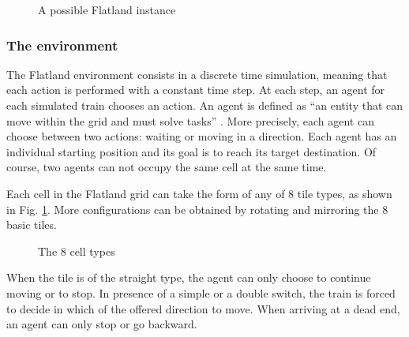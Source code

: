 \documentclass[a4paper, 12pt]{article}
\numberwithin{equation}{section}
\begin{document}
\begin{figure}[h]
	\centering
		\caption{A possible Flatland instance}
\end{figure}

\subsubsection{The environment}

The Flatland environment \cite{flatland-challenge} consists in a discrete time simulation, meaning that each action is performed with a constant time step. At each step, an agent for each simulated train chooses an action. An agent is defined as ``an entity that can move within the grid and must solve tasks'' \cite{flatland-challenge}. More precisely, each agent can choose between two actions: waiting or moving in a direction. Each agent has an individual starting position and its goal is to reach its target destination. Of course, two agents can not occupy the same cell at the same time.

Each cell in the Flatland grid can take the form of any of 8 tile types, as shown in Fig. \ref{fig:cell-types}. More configurations can be obtained by rotating and mirroring the 8 basic tiles.

\begin{figure}[h]
	\centering
		\caption{The 8 cell types}
	\label{fig:cell-types}
\end{figure}

When the tile is of the straight type, the agent can only choose to continue moving or to stop. In presence of a simple or a double switch, the train is forced to decide in which of the offered direction to move. When arriving at a dead end, an agent can only stop or go backward.
\end{document}
